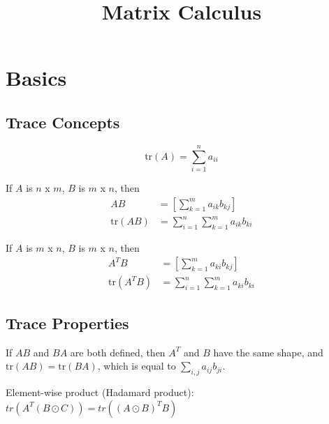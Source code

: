 \documentclass{article}
\title{Matrix Calculus}
\date{}
\begin{document}
\maketitle

\section{Basics}
\subsection{Trace Concepts}
\begin{equation*}
  \text{tr}(A) = \sum_{i = 1}^{n} a_{ii}
\end{equation*}

If $A$ is $n$ x $m$, $B$ is $m$ x $n$, then
\begin{align*}
    AB &= [\sum_{k = 1}^{m} a_{ik} b_{kj}] \\
    \text{tr}(AB) &= \sum_{i = 1}^{n} \sum_{k = 1}^{m} a_{ik} b_{ki}
\end{align*}

If $A$ is $m$ x $n$, $B$ is $m$ x $n$, then
\begin{align*}
    A^{T}B &= [\sum_{k = 1}^{m} a_{ki} b_{kj}] \\
    \text{tr}(A^{T}B) &= \sum_{i = 1}^{n} \sum_{k = 1}^{m} a_{ki} b_{ki}
\end{align*}

\subsection{Trace Properties}
If $AB$ and $BA$ are both defined, then $A^{T}$ and $B$ have the same shape, and $\text{tr}(AB) = \text{tr}(BA)$, which is equal to $\sum_{i, j} a_{ij}b_{ji}$. \bigskip

Element-wise product (Hadamard product):  $tr(A^T (B \odot C)) = tr((A \odot B)^T B)$
\end{document}
